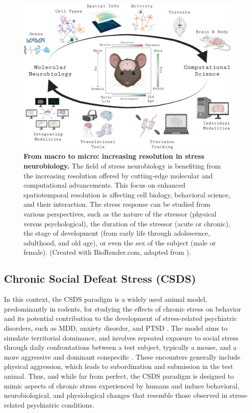 \begin{figure}[!thb]
\centering
\includegraphics[width=\textwidth]{Figures/intro_6.pdf}

\caption[\textbf{From macro to micro: increasing resolution in stress neurobiology}]{\textbf{From macro to micro: increasing resolution in stress neurobiology.}  The field of stress neurobiology is benefiting from the increasing resolution offered by cutting-edge molecular and computational advancements. This focus on enhanced spatiotemporal resolution is affecting cell biology, behavioral science, and their interaction. The stress response can be studied from various perspectives, such as the nature of the stressor (physical versus psychological), the duration of the stressor (acute or chronic), the stage of development (from early life through adolescence, adulthood, and old age), or even the sex of the subject (male or female). (Created with BioRender.com, adapted from \cite{Miranda2023IncreasingBehaviors}).}
\label{fig:1.6}

\end{figure}

\subsection{Chronic Social Defeat Stress (CSDS)}

In this context, the CSDS paradigm is a widely used animal model, predominantly in rodents, for studying the effects of chronic stress on behavior and its potential contribution to the development of stress-related psychiatric disorders, such as MDD, anxiety disorder, and PTSD \cite{Russo2013TheDisorders}. The model aims to simulate territorial dominance, and involves repeated exposure to social stress through daily confrontations between a test subject, typically a mouse, and a more aggressive and dominant conspecific \cite{Golden2011AMice}. These encounters generally include physical aggression, which leads to subordination and submission in the test animal. Thus, and while far from perfect, the CSDS paradigm is designed to mimic aspects of chronic stress experienced by humans and induce behavioral, neurobiological, and physiological changes that resemble those observed in stress-related psychiatric conditions.


